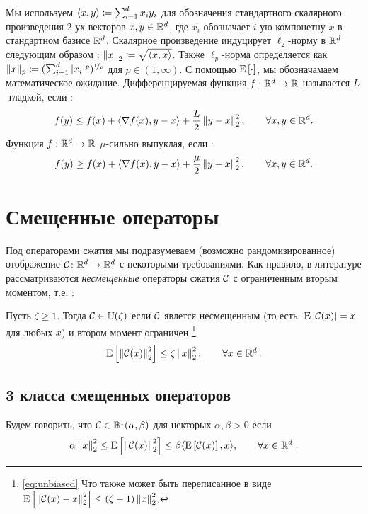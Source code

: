 \documentclass[12pt, twoside]{article}
\begin{document}
Мы используем  $\langle  x,y  \rangle \coloneqq \sum_{i=1}^d x_i y_i$ для обозначения стандартного скалярного произведения 2-ух векторов  $x,y\in\mathbb{R}^d$, где $x_i$ обозначает $i$-ую компонетну $x$ в стандартном базисе $\mathbb{R}^d$. Скалярное произведение индуцирует $\ell_2$-норму в  $\mathbb{R}^d$ следующим образом : $\left\| x \right\|_2 \coloneqq\sqrt{\langle  x, x  \rangle}$.  Также $\ell_p$-норма определяется как $\|x\|_p \coloneqq (\sum_{i=1}^d|x_i|^p)^{\nicefrac{1}{p}}$ для $p\in(1,\infty)$.
С помощью ${{\rm E}}\left[\cdot\right]$, мы обозначамаем математическое ожидание.
Дифференцируемая функция $f:\mathbb{R}^d\to \mathbb{R}$ называется $L$-гладкой, если :
$$f(y) \leq f(x) + \langle \nabla f(x), y-x \rangle + \frac{L}{2}\left\| y-x \right\|_2^2,  \qquad \forall x,y\in \mathbb{R}^d.$$
Функция $f:\mathbb{R}^d\to \mathbb{R}$ $\mu$-сильно выпуклая, если :
$$f(y) \geq f(x) + \langle \nabla f(x), y-x \rangle + \frac{\mu}{2} \left\| y-x \right\|_2^2, \qquad \forall x,y\in \mathbb{R}^d.$$ 

\section{Смещенные операторы}
Под операторами сжатия мы подразумеваем (возможно рандомизированное) отображение ${\cal C}\colon\mathbb{R}^d\to\mathbb{R}^d$ с некоторыми требованиями.
Как правило, в литературе рассматриваются {\em несмещенные} операторы сжатия ${\cal C}$ с ограниченным вторым моментом, т.е. :

\begin{definition}
Пусть $\zeta \geq 1$. Тогда  ${\cal C}\in \mathbb{U}(\zeta)$ если ${\cal C}$ явлется несмещенным (то есть, ${{\rm E}}\left[{\cal C}(x)\right]=x$ для любых $x$) и втором момент ограничен \footnote{\eqref{eq:unbiased} Что также может быть переписанное в виде ${{\rm E}}\left[ \left\| {\cal C}(x) -x  \right\|_2^2 \right] \leq (\zeta-1)  \left\| x \right\|_2^2 $.}
\begin{equation}\label{eq:unbiased}
 {{\rm E}}\left[ \left\| {\cal C}(x) \right\|_2^2 \right] \leq \zeta  \left\| x \right\|_2^2, \qquad \forall x\in\mathbb{R}^d \,.
\end{equation} 

\end{definition}

\subsection{3 класса смещенных операторов}
\begin{definition}\label{def:comp_I}
Будем говорить, что  ${\cal C}\in \mathbb{B}^1(\alpha,\beta)$ для некторых $\alpha,\beta>0$ если
\begin{equation} \label{eq:alpha-beta} \alpha \left\| x \right\|_2^2 \leq {{\rm E}}\left[ \left\| {\cal C}(x) \right\|_2^2 \right] \leq \beta  \langle {{\rm E}}\left[{\cal C}(x)\right],x \rangle, \qquad \forall x\in\mathbb{R}^d \; .
\end{equation}
\end{definition}
\end{document}
